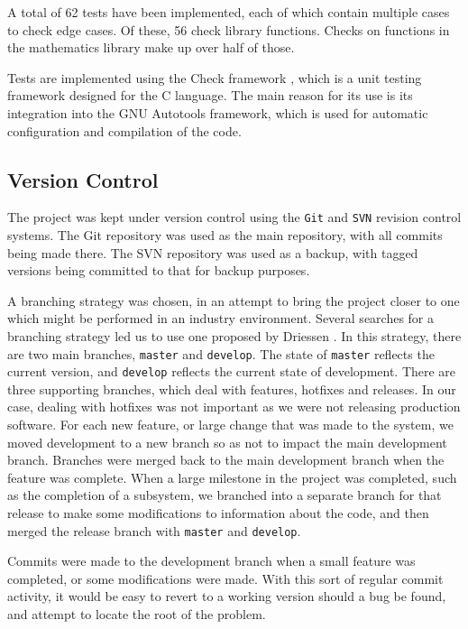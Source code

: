 \documentclass[a4paper,11pt]{article}
\begin{document}
   A total of 62 tests have been implemented, each of which contain multiple
   cases to check edge cases. Of these, 56 check library functions. Checks on
   functions in the mathematics library make up over half of those.

   Tests are implemented using the Check framework \cite{check}, which is a unit
   testing framework designed for the C language. The main reason for its use is
   its integration into the GNU Autotools framework, which is used for automatic
   configuration and compilation of the code.
\subsection{Version Control}
\label{sec-4-4}

   The project was kept under version control using the \texttt{Git} and
   \texttt{SVN} revision control systems. The Git repository was used as the
   main repository, with all commits being made there. The SVN repository was
   used as a backup, with tagged versions being committed to that for backup
   purposes.

   A branching strategy was chosen, in an attempt to bring the project closer to
   one which might be performed in an industry environment. Several searches for
   a branching strategy led us to use one proposed by Driessen
   \cite{driessen}. In this strategy, there are two main branches,
   \texttt{master} and \texttt{develop}. The state of \texttt{master} reflects
   the current version, and \texttt{develop} reflects the current state of
   development. There are three supporting branches, which deal with features,
   hotfixes and releases. In our case, dealing with hotfixes was not important
   as we were not releasing production software. For each new feature, or large
   change that was made to the system, we moved development to a new branch so
   as not to impact the main development branch. Branches were merged back to
   the main development branch when the feature was complete. When a large
   milestone in the project was completed, such as the completion of a
   subsystem, we branched into a separate branch for that release to make some
   modifications to information about the code, and then merged the release
   branch with \texttt{master} and \texttt{develop}.

   Commits were made to the development branch when a small feature was
   completed, or some modifications were made. With this sort of regular commit
   activity, it would be easy to revert to a working version should a bug be
   found, and attempt to locate the root of the problem.
\end{document}
